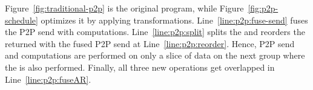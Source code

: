 Figure~\ref{fig:traditional-p2p} is the original program, 
while Figure~\ref{fig:p2p-schedule} optimizes it by applying transformations.
Line~\ref{line:p2p:fuse-send} fuses the P2P 
send with computations.
Line~\ref{line:p2p:split} splits the \allreduce and reorders the returned \allgather with the fused P2P send at Line~\ref{line:p2p:reorder}.
Hence, P2P send and computations are performed 
on only a slice of data on the next group where the \allgather is also performed.
Finally, all three new operations get overlapped in Line~\ref{line:p2p:fuseAR}.

